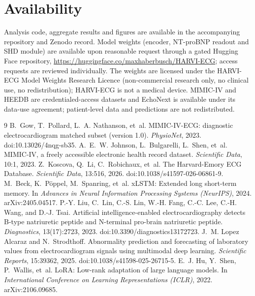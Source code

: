 \documentclass[10pt]{article}
\begin{document}
\section{Availability}\label{sec:avail}
Analysis code, aggregate results and figures are available in the accompanying repository and Zenodo record. Model weights (encoder, NT-proBNP readout and SHD module) are available upon reasonable request through a gated Hugging Face repository, \url{https://huggingface.co/maxhaberbusch/HARVI-ECG}; access requests are reviewed individually. The weights are licensed under the HARVI-ECG Model Weights Research Licence (non-commercial research only, no clinical use, no redistribution); HARVI-ECG is not a medical device. MIMIC-IV and HEEDB are credentialed-access datasets and EchoNext is available under its data-use agreement; patient-level data and predictions are not redistributed.

\begin{thebibliography}{9}\small\setlength{\itemsep}{1pt}
 B.~Gow, T.~Pollard, L.~A. Nathanson, et~al. MIMIC-IV-ECG: diagnostic electrocardiogram matched subset (version 1.0). \emph{PhysioNet}, 2023. doi:10.13026/4nqg-sb35.
 A.~E.~W. Johnson, L.~Bulgarelli, L.~Shen, et~al. MIMIC-IV, a freely accessible electronic health record dataset. \emph{Scientific Data}, 10:1, 2023.
 Z.~Koscova, Q.~Li, C.~Robichaux, et~al. The Harvard-Emory ECG Database. \emph{Scientific Data}, 13:516, 2026. doi:10.1038/s41597-026-06861-9.
 M.~Beck, K.~P\"oppel, M.~Spanring, et~al. xLSTM: Extended long short-term memory. In \emph{Advances in Neural Information Processing Systems (NeurIPS)}, 2024. arXiv:2405.04517.
 P.-Y. Liu, C.~Lin, C.-S. Lin, W.-H. Fang, C.-C. Lee, C.-H. Wang, and D.-J. Tsai. Artificial intelligence-enabled electrocardiography detects B-type natriuretic peptide and N-terminal pro-brain natriuretic peptide. \emph{Diagnostics}, 13(17):2723, 2023. doi:10.3390/diagnostics13172723.
 J.~M. Lopez Alcaraz and N.~Strodthoff. Abnormality prediction and forecasting of laboratory values from electrocardiogram signals using multimodal deep learning. \emph{Scientific Reports}, 15:39362, 2025. doi:10.1038/s41598-025-26715-5.
 E.~J. Hu, Y.~Shen, P.~Wallis, et~al. LoRA: Low-rank adaptation of large language models. In \emph{International Conference on Learning Representations (ICLR)}, 2022. arXiv:2106.09685.
\end{thebibliography}
\end{document}
